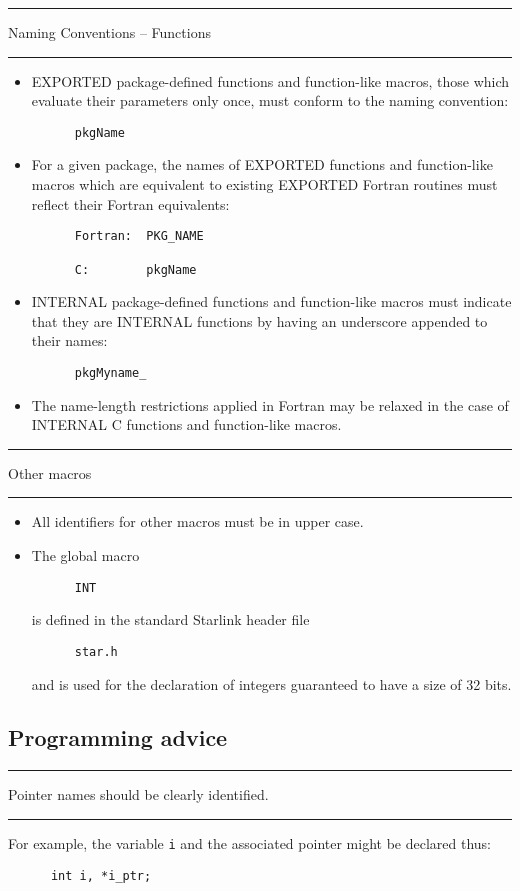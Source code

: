 \documentclass[twoside,11pt]{article}
\newcounter{sruleno}
\newcommand{\srule}[1]{
    \addtocounter{sruleno}{1}
    \goodbreak
    \rule[0.5ex]{\textwidth}{0.3mm}
    {\Large #1 \hfill {\thesruleno}}
    \rule[0.5ex]{\textwidth}{0.1mm}
}
\newcommand{\srule}[1]{
       \addtocounter{sruleno}{1}
       \begin{rawhtml} <HR> \end{rawhtml}
       {\Large \thesruleno}~~~~{\Large #1}
       \begin{rawhtml} <HR> \end{rawhtml}
       \end{tabular}
  }
\begin{document}
\srule{Naming Conventions -- Functions}
\begin{itemize}  
\item EXPORTED package-defined functions and function-like macros, those which 
evaluate their parameters only once, must conform to the naming convention:
\begin{verbatim}
      pkgName
\end{verbatim}
\item For a given package, the names of EXPORTED functions 
and function-like macros which are 
equivalent to existing EXPORTED Fortran routines must reflect their 
Fortran equivalents:
\begin{verbatim}
      Fortran:  PKG_NAME

      C:        pkgName
\end{verbatim}
\item INTERNAL package-defined functions and function-like macros 
must indicate that they are INTERNAL 
functions by having an underscore appended to their names:
\begin{verbatim}
      pkgMyname_
\end{verbatim}
\item The name-length restrictions applied in Fortran may be relaxed in the 
case of INTERNAL C functions and function-like macros.
\end{itemize}

\srule{Other macros}
\begin{itemize}
\item All identifiers for other macros must be in upper case.
\item The global macro
\begin{verbatim}
      INT
\end{verbatim}
is defined in the standard Starlink header file
\begin{verbatim}
      star.h
\end{verbatim}
and is used for the declaration of integers guaranteed to have a size of 
32 bits.
\end{itemize}

\subsection{Programming advice}

\srule{Pointer names should be clearly identified.}
For example, the variable {\tt i} and the associated pointer 
might be declared thus:
\begin{verbatim}
      int i, *i_ptr;
\end{verbatim}
\end{document}
